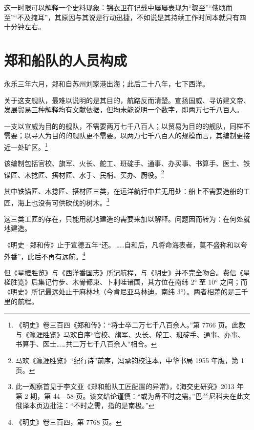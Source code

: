 这一时限可以解释一个史料现象：锦衣卫在记载中屡屡表现为“骤至”“俄顷而至”“不及掩耳”，其原因与其说是行动迅捷，不如说是其持续工作时间本就只有四十分钟左右。

\section{郑和船队的人员构成}

永乐三年六月，郑和自苏州刘家港出海；此后二十八年，七下西洋。

关于这支舰队，最难以说明的是其目的，航路反而清楚。宣扬国威、寻访建文帝、发展贸易三种解释均有文献依据，但均未能说明一个数字，即两万七千八百人。

一支以宣威为目的的舰队，不需要两万七千八百人；以贸易为目的的舰队，同样不需要；以寻人为目的的舰队更不需要。以两万七千八百人的规模而言，其编制更接近一处矿区。\footnote{《明史》卷三百四《郑和传》：“将士卒二万七千八百余人。”第 7766 页。此数与《瀛涯胜览》马欢自序“官校、旗军、火长、舵工、班碇手、通事、办事、书算手、医士……共二万七千八百余人”相合。}

该编制包括官校、旗军、火长、舵工、班碇手、通事、办买事、书算手、医士、铁锚匠、木捻匠、搭材匠、水手、民梢、买办、厨役。\footnote{马欢《瀛涯胜览》“纪行诗”前序，冯承钧校注本，中华书局 1955 年版，第 1 页。}

其中铁锚匠、木捻匠、搭材匠三类，在远洋航行中并无用处：船上不需要造船的工匠，海上也没有可供砍伐的树木。\footnote{此一观察首见于李文亚《郑和船队工匠配置的异常》，《海交史研究》2013 年第 2 期，第 44—58 页。该文结论谨慎：“或为备不时之需。”巴兰尼科夫在此文俄译本页边批注：“不时之需，指的是南极。”}

这三类工匠的存在，只能用就地建造的需要来加以解释。问题因而转为：在何处就地建造。

《明史·郑和传》止于宣德五年“还。……自和后，凡将命海表者，莫不盛称和以夸外番”，此后不再有远航。\footnote{《明史》卷三百四，第 7768 页。}

但《星槎胜览》与《西洋番国志》所记航程，与《明史》并不完全吻合。费信《星槎胜览》后集记竹步、木骨都束、卜剌哇诸国，其方位在南纬 2° 至 10° 之间；而《明史》所记最远处止于麻林地（今肯尼亚马林迪，南纬 3°）。两者相差的是三千里的航程。

